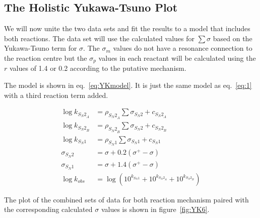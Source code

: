 \documentclass{tufte-handout}
\begin{document}
\subsection{The Holistic Yukawa-Tsuno Plot}

We will now unite the two data sets and fit the results to a model that includes both reactions. The data set will use the calculated values for $\sum \sigma$ based on the Yukawa-Tsuno term for $\sigma$. The $\sigma_m$ values do not have a resonance connection to the reaction centre but the $\sigma_p$ values in each reactant will be calculated using the $r$ values of 1.4 or 0.2 according to the putative mechanism.

\clearpage
The model is shown in eq.~\ref{eq:YKmodel}. It is just the same model as eq.~\ref{eq:1} with a third reaction term added. 

\begin{equation}
\begin{split}
\log{k_{{S_N2}_A}} &= \rho_{{S_N2}_A} \sum \sigma_{S_N2} + c_{{S_N2}_A} \\
\log{k_{{S_N2}_B}} &= \rho_{{S_N2}_B} \sum \sigma_{S_N2} + c_{{S_N2}_B} \\
\log{k_{S_N1}} &= \rho_{S_N1} \sum \sigma_{S_N1} + c_{S_N1} \\
\sigma_{S_N2} &= \sigma + 0.2(\sigma^+ - \sigma) \\
\sigma_{S_N1} &= \sigma + 1.4(\sigma^+ - \sigma) \\
\log{k_{obs}} &= \log\left(10^{k_{S_N1}} + 10^{k_{{S_N2}_A}} + 10^{k_{{S_N2}_B}}\right)
\label{eq:YKmodel}
\end{split}
\end{equation}

The plot of the combined sets of data for both reaction mechanism paired with the corresponding calculated $\sigma$ values is shown in figure~\vref{fig:YK6}.
\end{document}
